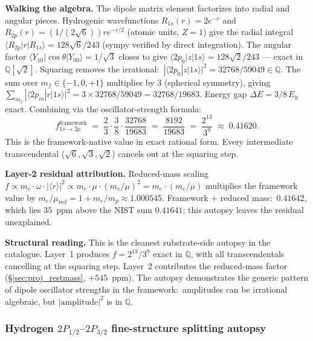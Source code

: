 \documentclass[11pt]{article}
\begin{document}
\textbf{Walking the algebra.}  The dipole matrix element factorizes
into radial and angular pieces.  Hydrogenic wavefunctions
$R_{1s}(r) = 2 e^{-r}$ and $R_{2p}(r) = (1/(2\sqrt{6})) r e^{-r/2}$
(atomic units, $Z=1$) give the radial integral
$\langle R_{2p} | r | R_{1s}\rangle = 128\sqrt{6}/243$ (sympy
verified by direct integration).  The angular factor
$\langle Y_{10} | \cos\theta | Y_{00}\rangle = 1/\sqrt{3}$ closes
to give $\langle 2p_0 | z | 1s\rangle = 128\sqrt{2}/243$ — exact in
$\mathbb{Q}[\sqrt{2}]$.  Squaring removes the irrational:\
$|\langle 2p_0 | z | 1s\rangle|^2 = 32768/59049 \in \mathbb{Q}$.
The sum over $m_f \in \{-1, 0, +1\}$ multiplies by $3$ (spherical
symmetry), giving $\sum_{m_f} |\langle 2p_m | r | 1s\rangle|^2 =
3 \times 32768/59049 = 32768/19683$.  Energy gap $\Delta E = 3/8\,E_h$
exact.  Combining via the oscillator-strength formula:
\begin{equation*}
f^{\mathrm{framework}}_{1s \to 2p} \;=\; \frac{2}{3} \cdot \frac{3}{8} \cdot \frac{32768}{19683} \;=\; \frac{8192}{19683} \;=\; \frac{2^{13}}{3^9} \;\approx\; 0.41620.
\end{equation*}
This is the framework-native value in exact rational form.  Every
intermediate transcendental ($\sqrt{6}, \sqrt{3}, \sqrt{2}$) cancels
out at the squaring step.

\textbf{Layer-2 residual attribution.}  Reduced-mass scaling
$f \propto m_e \cdot \omega \cdot |\langle r \rangle|^2 \propto m_e \cdot \mu \cdot (m_e/\mu)^2 = m_e \cdot (m_e/\mu)$
multiplies the framework value by $m_e/\mu_{\mathrm{red}} = 1 + m_e/m_p \approx 1.000545$.  Framework $+$ reduced mass:\ $0.41642$, which
lies $35$~ppm above the NIST sum $0.41641$; this autopsy leaves the
residual unexplained.

\textbf{Structural reading.}  This is the cleanest substrate-side
autopsy in the catalogue.  Layer~1 produces $f = 2^{13}/3^9$ exact
in $\mathbb{Q}$, with all transcendentals cancelling at the
squaring step.  Layer~2 contributes the reduced-mass factor
(\S\ref{sec:proj_restmass}, $+545$~ppm).  The autopsy demonstrates the generic pattern of dipole
oscillator strengths in the framework:\ amplitudes can be irrational
algebraic, but $|\mathrm{amplitude}|^2$ is in $\mathbb{Q}$.

\subsubsection{Hydrogen $2P_{1/2}$--$2P_{3/2}$ fine-structure splitting autopsy}
\label{sec:autopsy_h_2p_fs}
\end{document}
